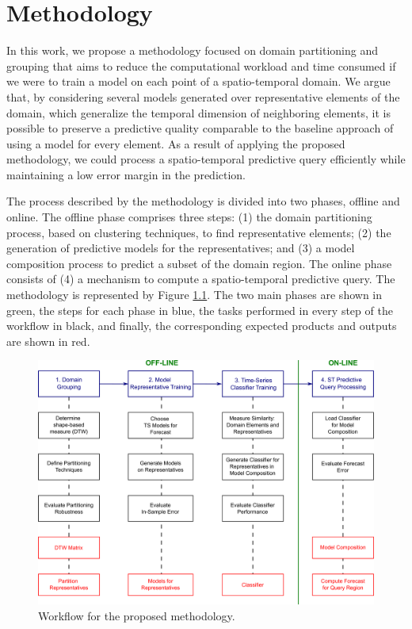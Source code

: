 \chapter[Methodology]{Methodology}
\label{Chapter:Methodology}

In this work, we propose a methodology focused on domain partitioning and grouping that aims to reduce the computational workload and time consumed if we were to train a model on each point of a spatio-temporal domain. We argue that, by considering several models generated over representative elements of the domain, which generalize the temporal dimension of neighboring elements, it is possible to preserve a predictive quality comparable to the baseline approach of using a model for every element. As a result of applying the proposed methodology, we could process a spatio-temporal predictive query efficiently while maintaining a low error margin in the prediction.

The process described by the methodology is divided into two phases, offline and online. The offline phase comprises three steps: (1) the domain partitioning process, based on clustering techniques, to find representative elements; (2) the generation of predictive models for the representatives; and (3) a model composition process to predict a subset of the domain region. The online phase consists of (4) a mechanism to compute a spatio-temporal predictive query. The methodology is represented by Figure \ref{Fig:OverviewMethodology}. The two main phases are shown in green, the steps for each phase in blue, the tasks performed in every step of the workflow in black, and finally, the corresponding expected products and outputs are shown in red. 

\begin{figure}[h]
	\centering
	\includegraphics[scale=0.16]{../Figures/Methodology_Complete}
	\caption{Workflow for the proposed methodology.}
	\label{Fig:OverviewMethodology}
\end{figure}

